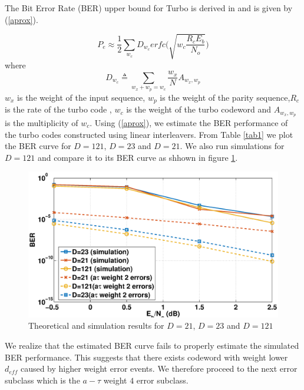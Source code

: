 \documentclass[a4paper, 12pt, oneside, openary]{jbook}
\begin{document}
The Bit Error Rate (BER) upper bound for Turbo is derived in \cite{ref6} and is given by (\ref{aprox}).

\begin{equation} 
 P_e \approx \frac{1}{2}\sum_{w_c}D_{w_c} 
  erfc \Bigg(\sqrt{w_c\frac{R_cE_b}{N_o}} \Bigg)
  \label{aprox}
  \end{equation}
 where 
  $$ D_{w_c}\triangleq \sum_{w_x+w_p=w_c} \frac{w_x}{N}A_{w_x,w_p}$$
  $w_x$ is the weight of the input sequence, $w_p$ is the weight of the parity 
  sequence,$R_c$ is the rate of the turbo code , $w_c$ is the weight of the turbo 
  codeword and $A_{w_x,w_p}$ is the multiplicity of $w_c$. Using  (\ref{aprox}), we estimate the BER performance of the turbo codes constructed using linear interleavers. From Table \ref{tab1} we plot the BER curve for $D=121$, $D=23$ and $D=21$. We also run simulations for $D=121$ and compare it to its BER curve as shhown in figure \ref{t1comp}. 
  
  \begin{figure}[h!]
\centering
\includegraphics[width=\textwidth]{D_23_21_121_N_256.eps}
\caption{Theoretical and simulation results for $D=21$, $D=23$ and $D=121$}
\label{t1comp}
\end{figure}
  
  We realize that the estimated BER curve fails to properly estimate the simulated BER performance. This suggests that there exists codeword with weight lower $d_{eff}$ caused by higher weight error events. We therefore proceed to the next error subclass which is the $a-\tau$ weight $4$ error subclass.
\end{document}
